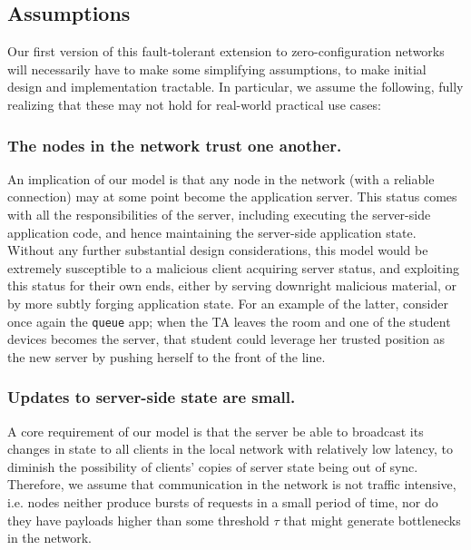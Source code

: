\subsection{Assumptions}

Our first version of this fault-tolerant extension to zero-configuration networks will necessarily have to make some simplifying assumptions, to make initial design and implementation tractable. 
In particular, we assume the following, fully realizing that these may not hold for real-world practical use cases:

\subsubsection*{The nodes in the network trust one another.} 

An implication of our model is that any node in the network (with a reliable connection) may at some point become the application server.
This status comes with all the responsibilities of the server, including executing the server-side application code, and hence maintaining the server-side application state.
Without any further substantial design considerations, this model would be extremely susceptible to a malicious client acquiring server status, and exploiting this status for their own ends, either by serving downright malicious material, or by more subtly forging application state.
For an example of the latter, consider once again the \texttt{queue} app; when the TA leaves the room and one of the student devices becomes the server, that student could leverage her trusted position as the new server by pushing herself to the front of the line.

\subsubsection*{Updates to server-side state are small.}

A core requirement of our model is that the server be able to broadcast its changes in state to all clients in the local network with relatively low latency, to diminish the possibility of clients' copies of server state being out of sync.
Therefore, we assume that communication in the network is not traffic intensive, i.e. nodes neither produce bursts of requests in a small period of time, nor do they have payloads higher than some threshold $\tau$ that might generate bottlenecks in the network.
